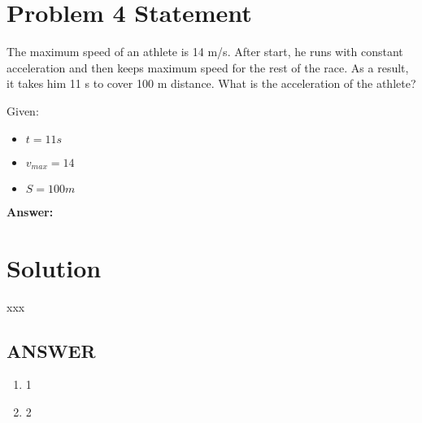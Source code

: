 \section*{Problem 4 Statement}

The maximum speed of an athlete is 14 m/s. After start, he runs with constant acceleration and
then keeps maximum speed for the rest of the race. As a result, it takes him 11 s to cover 100 m
distance. What is the acceleration of the athlete?

\bigbreak Given:

\begin{itemize}
    \item $t = 11s$
    \item $v_{max} = 14$
    \item $S = 100m$
\end{itemize}

\bigbreak 

\textbf{Answer:}

\section*{Solution}

xxx

\vfill
\subsection*{ANSWER}
\begin{enumerate}
    \item 1
    \item 2
\end{enumerate}